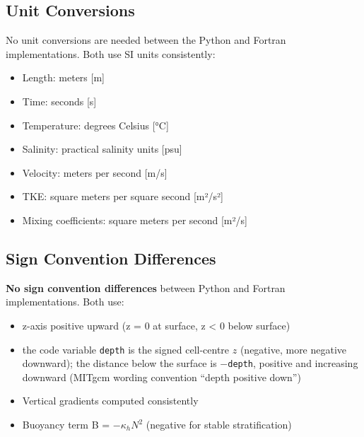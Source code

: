 \documentclass[11pt]{article}
\begin{document}
\subsection{Unit Conversions}

No unit conversions are needed between the Python and Fortran implementations. Both use SI units consistently:
\begin{itemize}
    \item Length: meters [m]
    \item Time: seconds [s]
    \item Temperature: degrees Celsius [°C]
    \item Salinity: practical salinity units [psu]
    \item Velocity: meters per second [m/s]
    \item TKE: square meters per square second [m²/s²]
    \item Mixing coefficients: square meters per second [m²/s]
\end{itemize}

\subsection{Sign Convention Differences}

\textbf{No sign convention differences} between Python and Fortran implementations. Both use:
\begin{itemize}
    \item z-axis positive upward (z = 0 at surface, z < 0 below surface)
    \item the code variable \verb|depth| is the signed cell-centre $z$ (negative, more negative downward); the distance below the surface is $-$\verb|depth|, positive and increasing downward (MITgcm wording convention ``depth positive down'')
    \item Vertical gradients computed consistently
    \item Buoyancy term B = $-\kappa_h N^2$ (negative for stable stratification)
\end{itemize}
\end{document}
